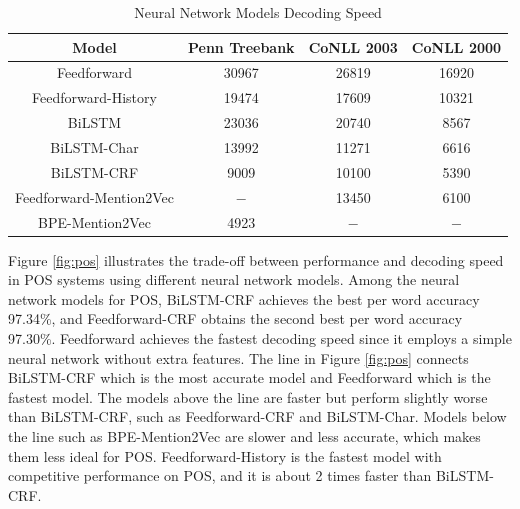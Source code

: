 \begin{table}[]
\centering
\caption{Neural Network Models Decoding Speed}
\label{table:my-label2}
\begin{tabular}{|c|c|c|c|}
\hline
Model & Penn Treebank & CoNLL 2003 & CoNLL 2000\\ \hline
Feedforward    & 30967    & 26819   & 16920 \\ \hline
Feedforward-History & 19474    & 17609  & 10321   \\ \hline
BiLSTM              & 23036    & 20740  & 8567    \\ \hline
BiLSTM-Char         & 13992    & 11271  & 6616         \\ \hline
BiLSTM-CRF     & 9009     & 10100  & 5390     \\ \hline
Feedforward-Mention2Vec     & $-$      & 13450 & 6100 \\ \hline
BPE-Mention2Vec     & 4923  &  $-$  & $-$       \\ \hline   
\end{tabular}
\end{table}



Figure \ref{fig:pos} illustrates the trade-off between performance and decoding speed in POS systems using different neural network models. Among the neural network models for POS, BiLSTM-CRF achieves the best per word accuracy 97.34\%, and Feedforward-CRF obtains the second best per word accuracy 97.30\%. Feedforward achieves the fastest decoding speed since it employs a simple neural network without extra features. The line in Figure \ref{fig:pos} connects BiLSTM-CRF which is the most accurate model and Feedforward which is the fastest model. The models above the line are faster but perform slightly worse than BiLSTM-CRF, such as Feedforward-CRF and BiLSTM-Char. Models below the line such as BPE-Mention2Vec are slower and less accurate, which makes them less ideal for POS. Feedforward-History is the fastest model with competitive performance on POS, and it is about 2 times faster than BiLSTM-CRF.

